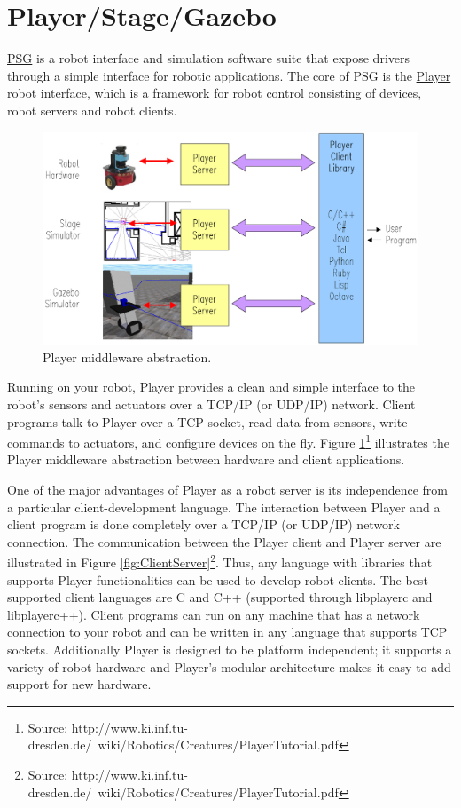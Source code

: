 \section{Player/Stage/Gazebo}

\href{http://playerstage.sourceforge.net}{PSG} is a robot interface and simulation software suite that expose drivers through a simple interface for robotic applications. The core of PSG is the \href{http://playerstage.sourceforge.net/wiki/Player}{Player robot interface}, which is a framework for robot control consisting of devices, robot servers and robot clients.

\begin{figure}[!h]
\label{fig:PlayerMiddleware}
\centering
\includegraphics[width=0.8\columnwidth]{figures/3_player_abstraction.png}
\caption{Player middleware abstraction.}
\end{figure}

Running on your robot, Player provides a clean and simple interface to the robot's sensors and actuators over a TCP/IP (or UDP/IP) network. Client programs talk to Player over a TCP socket, read data from sensors, write commands to actuators, and configure devices on the fly. Figure \ref{fig:PlayerMiddleware}\footnote{Source: http://www.ki.inf.tu-dresden.de/~wiki/Robotics/Creatures/PlayerTutorial.pdf} illustrates the Player middleware abstraction between hardware and client applications.

One of the major advantages of Player as a robot server is its independence from a particular client-development language.  The interaction between Player and a client program is done completely over a TCP/IP (or UDP/IP) network connection. The communication between the Player client and Player server are illustrated in Figure \ref{fig:ClientServer}\footnote{Source: http://www.ki.inf.tu-dresden.de/~wiki/Robotics/Creatures/PlayerTutorial.pdf}.  Thus, any language with libraries that supports Player functionalities can be used to develop robot clients.  The best-supported client languages are C and C++ (supported through libplayerc and libplayerc++). Client programs can run on any machine that has a network connection to your robot and can be written in any language that supports TCP sockets. Additionally Player is designed to be platform independent; it supports a variety of robot hardware and Player's modular architecture makes it easy to add support for new hardware.

